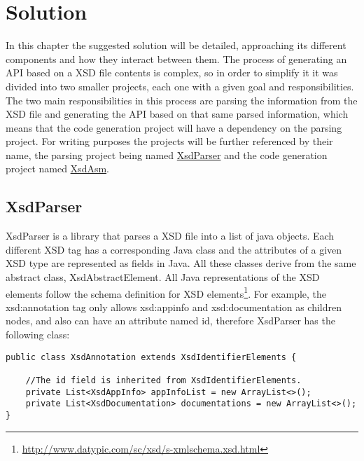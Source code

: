 \chapter{Solution}
\label{cha:solution}

In this chapter the suggested solution will be detailed, approaching its different components and how they interact between them. The process of generating an \ac{API} based on a \ac{XSD} file contents is complex, so in order to simplify it it was divided into two smaller projects, each one with a given goal and responsibilities. The two main responsibilities in this process are parsing the information from the \ac{XSD} file and generating the \ac{API} based on that same parsed information, which means that the code generation project will have a dependency on the parsing project. For writing purposes the projects will be further referenced by their name, the parsing project being named \hyperref[sec:xsdparser]{XsdParser} and the code generation project named \hyperref[sec:xsdasm]{XsdAsm}.

\section{XsdParser} %
\label{sec:xsdparser}

XsdParser is a library that parses a \ac{XSD} file into a list of java objects. Each different \ac{XSD} tag has a corresponding Java class and the  attributes of a given \ac{XSD} type are represented as fields in Java. All these classes derive from the same abstract class, XsdAbstractElement. All Java representations of the \ac{XSD} elements follow the schema definition for \ac{XSD} elements\footnote{\url{http://www.datypic.com/sc/xsd/s-xmlschema.xsd.html}}. For example, the xsd:annotation tag only allows xsd:appinfo and xsd:documentation as children nodes, and also can have an attribute named id, therefore XsdParser has the following class:

\lstset{language=Java}
\begin{minipage}{\linewidth}
\begin{lstlisting}[caption={XsdAnnotation class (simplified)},captionpos=b]
public class XsdAnnotation extends XsdIdentifierElements {

    //The id field is inherited from XsdIdentifierElements.
    private List<XsdAppInfo> appInfoList = new ArrayList<>();
    private List<XsdDocumentation> documentations = new ArrayList<>();
}
\end{lstlisting}
\end{minipage}

